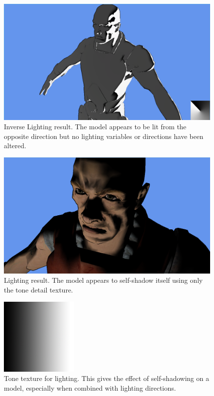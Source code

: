 \documentclass[annual]{acmsiggraph}
\begin{document}
\begin{figure}[h]
	\centering
	\includegraphics[width=5.5in]{images/inverse_lighting}
	\caption{Inverse Lighting result. The model appears to be lit from the opposite direction but no lighting variables or directions have been altered.}
	\label{fig:inverseLighting}
\end{figure}

\begin{figure}[h]
	\centering
	\includegraphics[width=5.5in]{images/lighting}
	\caption{Lighting result. The model appears to self-shadow itself using only the tone detail texture.}
	\label{fig:lightingResult}
\end{figure}

\begin{figure}[h]
	\centering
	\includegraphics[width=1.5in]{images/xtoon_shading_gradient}
	\caption{Tone texture for lighting. This gives the effect of self-shadowing on a model, especially when combined with lighting directions.}
	\label{fig:gradient}
\end{figure}
\end{document}
